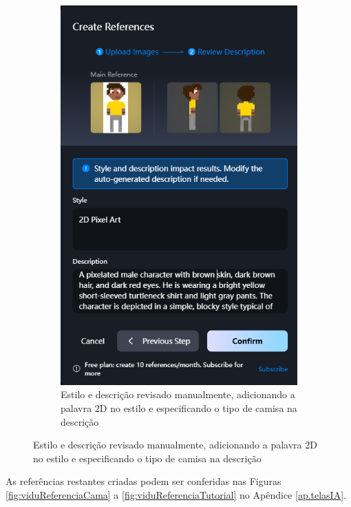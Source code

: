 \begin{figure}[htbp]
\begin{subfigure}{0.4\linewidth}
        \includegraphics[width=1\linewidth]{figs/vidu/tela_referencia_2_editado.PNG}
        \caption{\small Estilo e descrição revisado manualmente, adicionando a palavra 2D no estilo e especificando o tipo de camisa na descrição}
        \label{fig:viduReferenciaPablo2b}
    \end{subfigure}
\end{figure}

As referências restantes criadas podem ser conferidas nas Figuras \ref{fig:viduReferenciaCama} a \ref{fig:viduReferenciaTutorial} no Apêndice \ref{ap.telasIA}.

